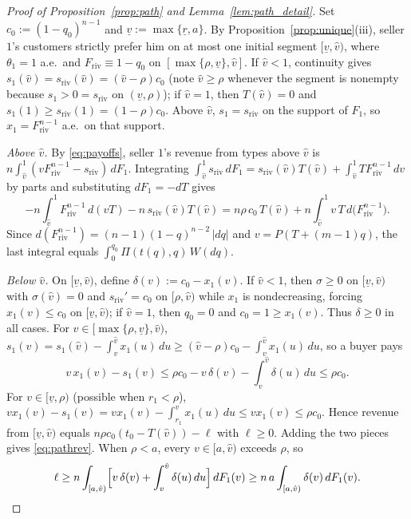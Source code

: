 \documentclass[12pt]{article}
\theoremstyle{mystyle}
\theoremstyle{mystyle2}
\newcommand{\1}{\mathbf{1}}
\begin{document}
\begin{proof}[Proof of Proposition~\ref{prop:path} and Lemma~\ref{lem:path_detail}]
Set $c_0:=(1-q_0)^{n-1}$ and $\underline v:=\max\{\underline r,a\}$. By Proposition~\ref{prop:unique}(iii), seller $1$'s customers strictly prefer him on at most one initial segment $[\underline v,\hat v)$, where $\theta_1=1$ a.e.\ and $F_{\mathrm{riv}}\equiv 1-q_0$ on $[\max\{\rho,\underline v\},\hat v]$. If $\hat v<1$, continuity gives $s_1(\hat v)=s_{\mathrm{riv}}(\hat v)=(\hat v-\rho)c_0$ (note $\hat v\ge\rho$ whenever the segment is nonempty because $s_1>0=s_{\mathrm{riv}}$ on $(\underline v,\rho)$); if $\hat v=1$, then $T(\hat v)=0$ and $s_1(1)\ge s_{\mathrm{riv}}(1)=(1-\rho)c_0$. Above $\hat v$, $s_1=s_{\mathrm{riv}}$ on the support of $F_1$, so $x_1=F_{\mathrm{riv}}^{n-1}$ a.e.\ on that support.

\emph{Above $\hat v$.} By \eqref{eq:payoffs}, seller $1$'s revenue from types above $\hat v$ is $n\int_{\hat v}^1(v F_{\mathrm{riv}}^{n-1}-s_{\mathrm{riv}})\,dF_1$. Integrating $\int_{\hat v}^1 s_{\mathrm{riv}}\,dF_1=s_{\mathrm{riv}}(\hat v)T(\hat v)+\int_{\hat v}^1 T F_{\mathrm{riv}}^{n-1}\,dv$ by parts and substituting $dF_1=-dT$ gives
\[
-n\int_{\hat v}^1 F_{\mathrm{riv}}^{n-1}\,d(vT) - n\,s_{\mathrm{riv}}(\hat v)T(\hat v)
= n\rho\,c_0\,T(\hat v) + n\int_{\hat v}^1 v\,T\,d\bigl(F_{\mathrm{riv}}^{n-1}\bigr).
\]
Since $d(F_{\mathrm{riv}}^{n-1})=(n-1)(1-q)^{n-2}\,|dq|$ and $v=P(T+(m-1)q)$, the last integral equals $\int_0^{q_0}\Pi(t(q),q)\,W(dq)$.

\emph{Below $\hat v$.} On $[\underline v,\hat v)$, define $\delta(v):=c_0-x_1(v)$. If $\hat v<1$, then $\sigma\ge 0$ on $[\underline v,\hat v)$ with $\sigma(\hat v)=0$ and $s_{\mathrm{riv}}'=c_0$ on $[\rho,\hat v)$ while $x_1$ is nondecreasing, forcing $x_1(v)\le c_0$ on $[\underline v,\hat v)$; if $\hat v=1$, then $q_0=0$ and $c_0=1\ge x_1(v)$. Thus $\delta\ge 0$ in all cases. For $v\in[\max\{\rho,\underline v\},\hat v)$, $s_1(v)=s_1(\hat v)-\int_v^{\hat v}x_1(u)\,du\ge (\hat v-\rho)c_0-\int_v^{\hat v}x_1(u)\,du$, so a buyer pays
\[
v\,x_1(v)-s_1(v) \le \rho c_0 - v\,\delta(v) - \int_v^{\hat v}\delta(u)\,du \le \rho c_0.
\]
For $v\in[\underline v,\rho)$ (possible when $r_1<\rho$), $v x_1(v)-s_1(v)=v x_1(v)-\int_{r_1}^v x_1(u)\,du\le v x_1(v)\le \rho c_0$. Hence revenue from $[\underline v,\hat v)$ equals $n\rho c_0(t_0-T(\hat v))-\ell$ with $\ell\ge 0$. Adding the two pieces gives \eqref{eq:pathrev}. When $\rho<a$, every $v\in[a,\hat v)$ exceeds $\rho$, so
\[
\ell \ge n\int_{[a,\hat v)}\Bigl[v\,\delta(v) + \int_v^{\hat v} \delta(u)\,du\Bigr]\,dF_1(v) \ge n\,a\int_{[a,\hat v)} \delta(v)\,dF_1(v).
\]


\end{proof}
\end{document}
